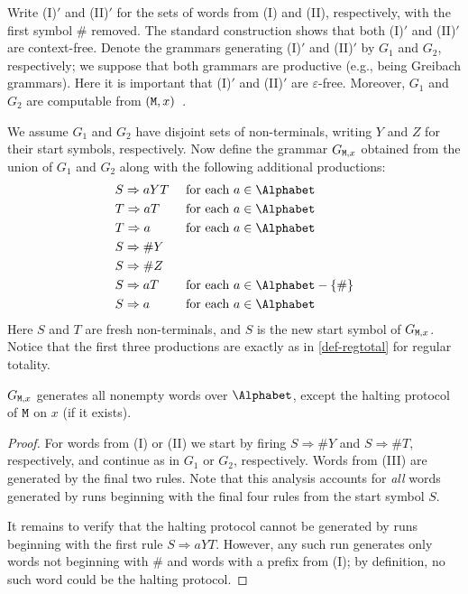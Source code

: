 \documentclass[runningheads]{amsart}
\newcommand{\TM}{\text{\rm\tt M}}
\begin{document}
Write (I)$'$ and (II)$'$ for the sets of words from (I) and (II), respectively, with the first symbol $\#$ removed.
The standard construction shows that both (I)$'$ and (II)$'$ are context-free. Denote the grammars generating (I)$'$ and (II)$'$ by $G_1$ and $G_2$, respectively; we suppose that both grammars are productive (e.g., being Greibach grammars). Here it is important that (I)$'$ and (II)$'$ are $\varepsilon$-free. Moreover, $G_1$ and $G_2$ are computable from $(\TM,x)$~\cite[Section~2.1]{Kuznetsov2021TOCL}. 

We assume $G_1$ and $G_2$ have disjoint sets of non-terminals, writing $Y$ and $Z$ for their start symbols, respectively. 
Now define the grammar $G_{\TM,x}$ obtained from the union of $G_1$ and $G_2$ along with the following additional productions:
\begin{align*}
& S \Rightarrow aYT && \mbox{ for each $a \in \Alphabet$} \\
& T \Rightarrow a T && \mbox{ for each $a \in \Alphabet$} \\
& T \Rightarrow a && \mbox{ for each $a \in \Alphabet$} \\
& S \Rightarrow \# Y \\
& S \Rightarrow \# Z \\
& S \Rightarrow a T && \mbox{ for each $a \in \Alphabet - \{ \# \}$} \\
& S \Rightarrow a && \mbox{ for each $a \in \Alphabet$}
\end{align*}
Here $S$  and $T$ are fresh non-terminals, and $S$ is the new start symbol of $G_{\TM,x}$.
Notice that the first three productions are exactly as in \cref{def-regtotal} for regular totality.

\begin{proposition}
\label{grammar-generates-all-but-haltprot}
    $G_{\TM,x}$ generates all nonempty words over $\Alphabet$, except the halting protocol of $\TM$ on $x$ (if it exists).
\end{proposition}
\begin{proof}
For words from (I) or (II) we start by firing $S \Rightarrow \# Y$ and $S \Rightarrow \# T$, respectively, and continue as in $G_1$ or $G_2$, respectively. 
Words from (III) are generated by the final two rules. Note that this analysis accounts for \emph{all} words generated by runs beginning with the final four rules from the start symbol $S$.

It remains to verify that the halting protocol cannot be generated by runs beginning with the first rule $S \Rightarrow a YT$.
However, any such run generates only words not beginning with $\#$ and words with a prefix from (I); by definition, no such word could be the halting protocol.    
\end{proof}
\end{document}
